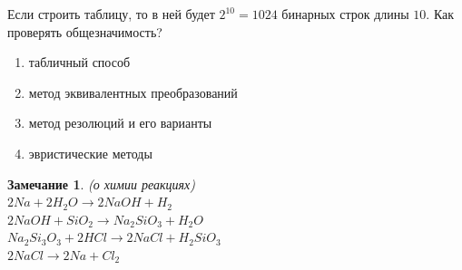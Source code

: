 \documentclass{article}
\newtheorem{Remark}{Замечание}
\numberwithin{example}{section}
\numberwithin{question}{section}
\numberwithin{Remark}{section}
\numberwithin{theorem}{section}
\numberwithin{definition}{section}
\numberwithin{proposition}{section}
\begin{document}
Если строить таблицу, то в ней будет $2^{10}=1024$ бинарных строк длины $10$. Как проверять общезначимость?
\begin{enumerate}
	\item табличный способ
	\item метод эквивалентных преобразований
	\item метод резолюций и его варианты
	\item эвристические методы
\end{enumerate}
\begin{Remark}
	(о химии реакциях)\\
	$2Na+2H_2O\to 2NaOH+H_2$\\
	$2NaOH+SiO_2\to Na_2SiO_3+H_2O$\\
	$Na_2Si_3O_3+2HCl\to 2NaCl+H_2SiO_3$\\
	$2NaCl\to 2Na+Cl_2$
\end{Remark}
\end{document}
